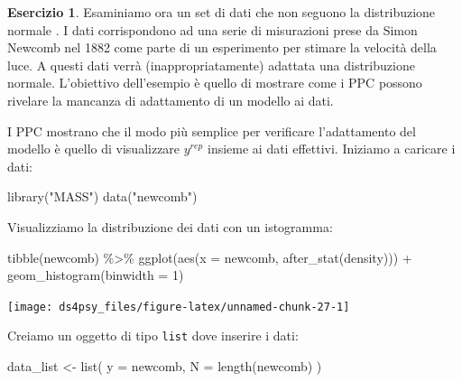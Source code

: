 \documentclass[
  11pt,
]{krantz}
\makeatletter
\newenvironment{Shaded}{\begin{snugshade}}{\end{snugshade}}
\newcommand{\AttributeTok}[1]{\textcolor[rgb]{0.61,0.61,0.61}{#1}}
\newcommand{\DecValTok}[1]{\textcolor[rgb]{0.06,0.06,0.06}{#1}}
\newcommand{\FunctionTok}[1]{\textcolor[rgb]{0,0,0}{#1}}
\newcommand{\NormalTok}[1]{#1}
\newcommand{\OtherTok}[1]{\textcolor[rgb]{0.37,0.37,0.37}{#1}}
\newcommand{\SpecialCharTok}[1]{\textcolor[rgb]{0,0,0}{#1}}
\newcommand{\StringTok}[1]{\textcolor[rgb]{0.5,0.5,0.5}{#1}}
\newenvironment{kframe}{%
\medskip{}
\setlength{\fboxsep}{.8em}
 \def\at@end@of@kframe{}%
 \ifinner\ifhmode%
  \def\at@end@of@kframe{\end{minipage}}%
  \begin{minipage}{\columnwidth}%
 \fi\fi%
 \def\FrameCommand##1{\hskip\@totalleftmargin \hskip-\fboxsep
 \colorbox{shadecolor}{##1}\hskip-\fboxsep
     \hskip-\linewidth \hskip-\@totalleftmargin \hskip\columnwidth}%
 \MakeFramed {\advance\hsize-\width
   \@totalleftmargin\z@ \linewidth\hsize
   \@setminipage}}%
 {\par\unskip\endMakeFramed%
 \at@end@of@kframe}
\renewenvironment{Shaded}{\begin{kframe}}{\end{kframe}}
\theoremstyle{definition}
\theoremstyle{definition}
\theoremstyle{definition}
\newtheorem{exercise}{Esercizio}[chapter]
\theoremstyle{definition}
\theoremstyle{remark}
\makeatother
\begin{document}
\begin{exercise}
Esaminiamo ora un set di dati che non seguono la distribuzione normale \citep{gelman2020regression}. I dati corrispondono ad una serie di misurazioni prese da Simon Newcomb nel 1882 come parte di un esperimento per stimare la velocità della luce. A questi dati verrà (inappropriatamente) adattata una distribuzione normale. L'obiettivo dell'esempio è quello di mostrare come i PPC possono rivelare la mancanza di adattamento di un modello ai dati.

I PPC mostrano che il modo più semplice per verificare l'adattamento del modello è quello di visualizzare \(y^{rep}\) insieme ai dati effettivi. Iniziamo a caricare i dati:

\begin{Shaded}
\begin{Highlighting}[]
\FunctionTok{library}\NormalTok{(}\StringTok{"MASS"}\NormalTok{)}
\FunctionTok{data}\NormalTok{(}\StringTok{"newcomb"}\NormalTok{)}
\end{Highlighting}
\end{Shaded}

Visualizziamo la distribuzione dei dati con un istogramma:

\begin{Shaded}
\begin{Highlighting}[]
\FunctionTok{tibble}\NormalTok{(newcomb) }\SpecialCharTok{\%\textgreater{}\%}
  \FunctionTok{ggplot}\NormalTok{(}\FunctionTok{aes}\NormalTok{(}\AttributeTok{x =}\NormalTok{ newcomb, }\FunctionTok{after\_stat}\NormalTok{(density))) }\SpecialCharTok{+}
  \FunctionTok{geom\_histogram}\NormalTok{(}\AttributeTok{binwidth =} \DecValTok{1}\NormalTok{)}
\end{Highlighting}
\end{Shaded}

\begin{center}\texttt{[image: ds4psy\_files/figure-latex/unnamed-chunk-27-1]} \end{center}

Creiamo un oggetto di tipo \texttt{list} dove inserire i dati:

\begin{Shaded}
\begin{Highlighting}[]
\NormalTok{data\_list }\OtherTok{\textless{}{-}} \FunctionTok{list}\NormalTok{(}
  \AttributeTok{y =}\NormalTok{ newcomb,}
  \AttributeTok{N =} \FunctionTok{length}\NormalTok{(newcomb)}
\NormalTok{)}
\end{Highlighting}
\end{Shaded}


\end{exercise}
\end{document}
